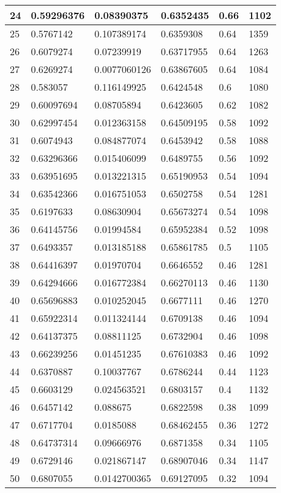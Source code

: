 \begin{longtable}{|l|l|l|l|l|l|}
24 & 0.59296376 & 0.08390375 & 0.6352435 & 0.66 & 1102 \\ \hline 
25 & 0.5767142 & 0.107389174 & 0.6359308 & 0.64 & 1359 \\ \hline 
26 & 0.6079274 & 0.07239919 & 0.63717955 & 0.64 & 1263 \\ \hline 
27 & 0.6269274 & 0.0077060126 & 0.63867605 & 0.64 & 1084 \\ \hline 
28 & 0.583057 & 0.116149925 & 0.6424548 & 0.6 & 1080 \\ \hline 
29 & 0.60097694 & 0.08705894 & 0.6423605 & 0.62 & 1082 \\ \hline 
30 & 0.62997454 & 0.012363158 & 0.64509195 & 0.58 & 1092 \\ \hline 
31 & 0.6074943 & 0.084877074 & 0.6453942 & 0.58 & 1088 \\ \hline 
32 & 0.63296366 & 0.015406099 & 0.6489755 & 0.56 & 1092 \\ \hline 
33 & 0.63951695 & 0.013221315 & 0.65190953 & 0.54 & 1094 \\ \hline 
34 & 0.63542366 & 0.016751053 & 0.6502758 & 0.54 & 1281 \\ \hline 
35 & 0.6197633 & 0.08630904 & 0.65673274 & 0.54 & 1098 \\ \hline 
36 & 0.64145756 & 0.01994584 & 0.65952384 & 0.52 & 1098 \\ \hline 
37 & 0.6493357 & 0.013185188 & 0.65861785 & 0.5 & 1105 \\ \hline 
38 & 0.64416397 & 0.01970704 & 0.6646552 & 0.46 & 1281 \\ \hline 
39 & 0.64294666 & 0.016772384 & 0.66270113 & 0.46 & 1130 \\ \hline 
40 & 0.65696883 & 0.010252045 & 0.6677111 & 0.46 & 1270 \\ \hline 
41 & 0.65922314 & 0.011324144 & 0.6709138 & 0.46 & 1094 \\ \hline 
42 & 0.64137375 & 0.08811125 & 0.6732904 & 0.46 & 1098 \\ \hline 
43 & 0.66239256 & 0.01451235 & 0.67610383 & 0.46 & 1092 \\ \hline 
44 & 0.6370887 & 0.10037767 & 0.6786244 & 0.44 & 1123 \\ \hline 
45 & 0.6603129 & 0.024563521 & 0.6803157 & 0.4 & 1132 \\ \hline 
46 & 0.6457142 & 0.088675 & 0.6822598 & 0.38 & 1099 \\ \hline 
47 & 0.6717704 & 0.0185088 & 0.68462455 & 0.36 & 1272 \\ \hline 
48 & 0.64737314 & 0.09666976 & 0.6871358 & 0.34 & 1105 \\ \hline 
49 & 0.6729146 & 0.021867147 & 0.68907046 & 0.34 & 1147 \\ \hline 
50 & 0.6807055 & 0.0142700365 & 0.69127095 & 0.32 & 1094 \\ \hline 
\end{longtable}
